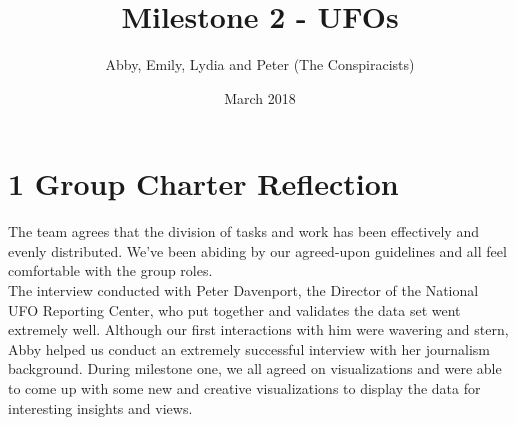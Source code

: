 \documentclass{neu_handout}
\title{Milestone 2 - UFOs}
\author{Abby, Emily, Lydia and Peter (The Conspiracists)}
\date{March 2018}
\begin{document}
\section*{1 Group Charter Reflection}

The team agrees that the division of tasks and work has been effectively and evenly distributed. We've been abiding by our agreed-upon guidelines and all feel comfortable with the group roles.\\

The interview conducted with Peter Davenport, the Director of the National UFO Reporting Center, who put together and validates the data set went extremely well. Although our first interactions with him were wavering and stern, Abby helped us conduct an extremely successful interview with her journalism background. During milestone one, we all agreed on visualizations and were able to come up with some new and creative visualizations to display the data for interesting insights and views.
\end{document}
